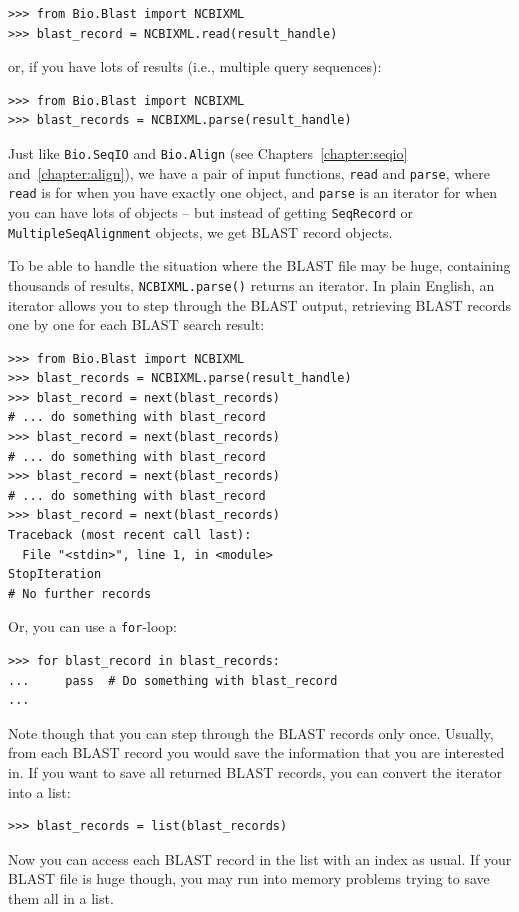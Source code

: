 \begin{verbatim}
>>> from Bio.Blast import NCBIXML
>>> blast_record = NCBIXML.read(result_handle)
\end{verbatim}

\noindent or, if you have lots of results (i.e., multiple query sequences):

\begin{verbatim}
>>> from Bio.Blast import NCBIXML
>>> blast_records = NCBIXML.parse(result_handle)
\end{verbatim}

Just like \verb|Bio.SeqIO| and \verb|Bio.Align|
(see Chapters~\ref{chapter:seqio} and~\ref{chapter:align}),
we have a pair of input functions, \verb|read| and \verb|parse|, where
\verb|read| is for when you have exactly one object, and \verb|parse|
is an iterator for when you can have lots of objects -- but instead of
getting \verb|SeqRecord| or \verb|MultipleSeqAlignment| objects, we
get BLAST record objects.

To be able to handle the situation where the BLAST file may be huge,
containing thousands of results, \verb|NCBIXML.parse()| returns an
iterator. In plain English, an iterator allows you to step through
the BLAST output, retrieving BLAST records one by one for each BLAST
search result:

\begin{verbatim}
>>> from Bio.Blast import NCBIXML
>>> blast_records = NCBIXML.parse(result_handle)
>>> blast_record = next(blast_records)
# ... do something with blast_record
>>> blast_record = next(blast_records)
# ... do something with blast_record
>>> blast_record = next(blast_records)
# ... do something with blast_record
>>> blast_record = next(blast_records)
Traceback (most recent call last):
  File "<stdin>", line 1, in <module>
StopIteration
# No further records
\end{verbatim}

Or, you can use a \verb|for|-loop:
\begin{verbatim}
>>> for blast_record in blast_records:
...     pass  # Do something with blast_record
...
\end{verbatim}

Note though that you can step through the BLAST records only once.
Usually, from each BLAST record you would save the information that
you are interested in. If you want to save all returned BLAST records,
you can convert the iterator into a list:
\begin{verbatim}
>>> blast_records = list(blast_records)
\end{verbatim}
Now you can access each BLAST record in the list with an index as usual.
If your BLAST file is huge though, you may run into memory problems trying to
save them all in a list.

